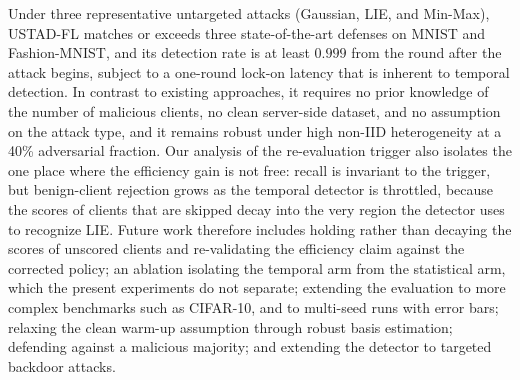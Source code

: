 \documentclass[journal]{IEEEtran}
\begin{document}
Under three representative untargeted attacks (Gaussian, LIE, and Min-Max), USTAD-FL matches or exceeds three state-of-the-art defenses on MNIST and Fashion-MNIST, and its detection rate is at least $0.999$ from the round after the attack begins, subject to a one-round lock-on latency that is inherent to temporal detection. In contrast to existing approaches, it requires no prior knowledge of the number of malicious clients, no clean server-side dataset, and no assumption on the attack type, and it remains robust under high non-IID heterogeneity at a 40\% adversarial fraction. Our analysis of the re-evaluation trigger also isolates the one place where the efficiency gain is not free: recall is invariant to the trigger, but benign-client rejection grows as the temporal detector is throttled, because the scores of clients that are skipped decay into the very region the detector uses to recognize LIE. Future work therefore includes holding rather than decaying the scores of unscored clients and re-validating the efficiency claim against the corrected policy; an ablation isolating the temporal arm from the statistical arm, which the present experiments do not separate; extending the evaluation to more complex benchmarks such as CIFAR-10, and to multi-seed runs with error bars; relaxing the clean warm-up assumption through robust basis estimation; defending against a malicious majority; and extending the detector to targeted backdoor attacks.
\end{document}
